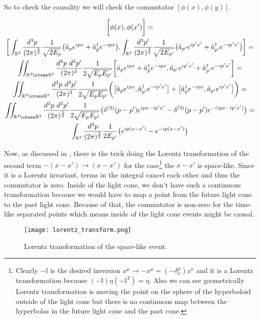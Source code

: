 So to check the causality we will check the commutator $[\phi(x), \phi(y)]$.

\begin{equation*}
    \begin{gathered}
        \bigg[\phi(x), \phi(x')\bigg] = \\
        \bigg[
            \int_{\mathbb{R}^{3}} \frac{d^{3}p}{(2 \pi)^{\frac{3}{2}}} \frac{1}{\sqrt{2 E_{p}}} \big(\hat{a}_{p} e^{ipx} + \hat{a}^{\dagger}_{p} e^{-ipx}\big),
            \int_{\mathbb{R}^{3}} \frac{d^{3}p'}{(2 \pi)^{\frac{3}{2}}} \frac{1}{\sqrt{2 E_{p'}}} \big(\hat{a}_{p'} e^{ip'x'} + \hat{a}^{\dagger}_{p'} e^{-ip'x'}\big)
        \bigg] = \\
        \iint_{\mathbb{R}^{3} \cross \mathbb{R}^{3}} \frac{d^{3}p \ d^{3}p'}{(2 \pi)^{3}} \frac{1}{2 \sqrt{E_{p} E_{p'}}}
        \bigg[
            \hat{a}_{p} e^{ipx} + \hat{a}^{\dagger}_{p} e^{-ipx},
            \hat{a}_{p'} e^{ip'x'} + \hat{a}^{\dagger}_{p'} e^{-ip'x'}
        \bigg] = \\
        \iint_{\mathbb{R}^{3} \cross \mathbb{R}^{3}} \frac{d^{3}p \ d^{3}p'}{(2 \pi)^{3}} \frac{1}{2 \sqrt{E_{p} E_{p'}}}
        \bigg(
            \big[\hat{a}_{p} e^{ipx}, \hat{a}^{\dagger}_{p'} e^{-ip'x'}\big] + \big[\hat{a}^{\dagger}_{p} e^{-ipx}, \hat{a}_{p'} e^{ip'x'}\big]
        \bigg) = \\
        \iint_{\mathbb{R}^{3} \cross \mathbb{R}^{3}} \frac{d^{3}p \ d^{3}p'}{(2 \pi)^{\frac{3}{2}}} \frac{1}{2 \sqrt{E_{p} E_{p'}}}
        \big(\delta^{(3)}(p - p') e^{ipx - ip'x'} - \delta^{(3)}(p - p') e^{-(ipx - ip'x')} \big) = \\
        \int_{\mathbb{R}^{3}} \frac{d^{3}p}{(2 \pi)^{\frac{3}{2}}} \frac{1}{2 E_{p'}} \big(e^{ip(x - x')} - e^{-ip(x - x')} \big)
    \end{gathered}
\end{equation*}

Now, as discussed in \cite{peskin_schroeder}, there is the trick doing the Lorentz transformation of the second term $-(x - x') \to (x - x')$ for the case\footnote{Clearly $-\mathbb{I}$ 
is the desired inversion $x^{\mu} \to -x^{\mu} = (-\delta^{\mu}_{\nu}) x^{\nu}$ and it is a Lorentz transformation because $(-\mathbb{I}) \eta 
(-\mathbb{I}^{T}) = \eta$. Also we can see geometrically Lorentz transformation is moving the point on the sphere of the hyperboloid outside of the
light cone but there is no continuous map between the hyperbolas in the future light cone and the past cone.} the $x - x'$ is space-like. Since it
is a Lorentz invariant, terms in the integral cancel each other and thus the commutator is zero. Inside of the light cone, we don't have such a continuous transformation
because we would have to map a point from the future light cone to the past light cone. Because of that, the commutator is non-zero for the time-like separated points which means 
inside of the light cone events might be causal.

\begin{figure}[H]
    \centering
    \texttt{[image: lorentz\_transform.png]}
    \caption{Lorentz transformation of the space-like event.}
    \label{fig:lorentz_transform}
\end{figure}


